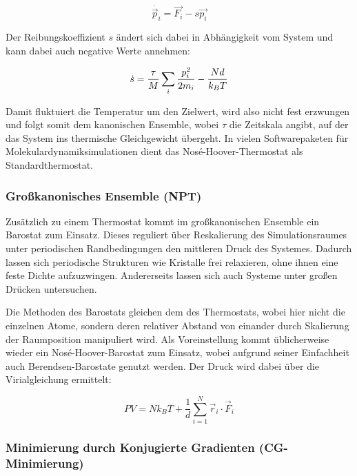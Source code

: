 \begin{equation}
  \dot{\vec p_i} = \vec{F_i} - s \vec{p_i}
\end{equation}

Der Reibungskoeffizient $s$ ändert sich dabei in Abhängigkeit vom System und kann dabei auch negative Werte annehmen:

\begin{equation}
  \dot s = {\tau \over M} \sum_i{{p_i^2 \over 2m_i} - {Nd \over k_BT}}
\end{equation}


Damit fluktuiert die Temperatur um den Zielwert, wird also nicht fest erzwungen und folgt somit dem kanonischen Ensemble, wobei $\tau$ die Zeitskala angibt, auf der das System ins thermische Gleichgewicht übergeht.
In vielen Softwarepaketen für Molekulardynamiksimulationen dient das Nosé-Hoover-Thermostat als Standardthermostat.

\subsubsection{Großkanonisches Ensemble (NPT)}

Zusätzlich zu einem Thermostat kommt im großkanonischen Ensemble ein Barostat zum Einsatz.
Dieses reguliert über Reskalierung des Simulationsraumes unter periodischen Randbedingungen den mittleren Druck des Systemes.
Dadurch lassen sich periodische Strukturen wie Kristalle frei relaxieren, ohne ihnen eine feste Dichte aufzuzwingen.
Andererseits lassen sich auch Systeme unter großen Drücken untersuchen.

Die Methoden des Barostats gleichen dem des Thermostats, wobei hier nicht die einzelnen Atome, sondern deren relativer Abstand von einander durch Skalierung der Raumposition manipuliert wird.
Als Voreinstellung kommt üblicherweise wieder ein Nosé-Hoover-Barostat zum Einsatz, wobei aufgrund seiner Einfachheit auch Berendsen-Barostate genutzt werden.
Der Druck wird dabei über die Virialgleichung  ermittelt:

\begin{equation}
  PV = Nk_BT + \frac{1}{d} \sum_{i=1}^N{\vec{r}_i \cdot \vec{F}_i}
\end{equation}

\subsubsection{Minimierung durch Konjugierte Gradienten (CG-Minimierung)}

